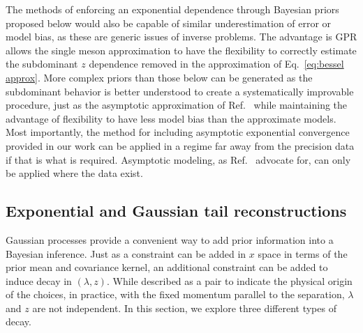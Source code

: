 \documentclass[aps,prl,groupedaddress,twocolumn,superscriptaddress,amsfonts,amssymb,amsmath,showpacs,floatfix,preprintnumbers]{revtex4-2}
\begin{document}
The methods of enforcing an exponential dependence through Bayesian priors proposed below would also be capable of similar underestimation of error or model bias, as these are generic issues of inverse problems. The advantage is GPR allows the single meson approximation to have the flexibility to correctly estimate the subdominant $z$ dependence removed in the approximation of Eq.~\ref{eq:bessel approx}. More complex priors than those below can be generated as the subdominant behavior is better understood to create a systematically improvable procedure, just as the asymptotic approximation of Ref.~\cite{Gao:2021dbh,Chen:2025cxr} while maintaining the advantage of flexibility to have less model bias than the approximate models. Most importantly, the method for including asymptotic exponential convergence provided in our work can be applied in a regime far away from the precision data if that is what is required. Asymptotic modeling, as Ref.~\cite{Gao:2021dbh,Chen:2025cxr} advocate for, can only be applied where the data exist.  



\subsection{Exponential and Gaussian tail reconstructions}

Gaussian processes provide a convenient way to add prior information into a Bayesian inference. 
Just as a constraint can be added in $x$ space in terms of the prior mean and covariance kernel, an additional constraint can be added to induce decay in $(\lambda,z)$. While described as a pair to indicate the physical origin of the choices, in practice, with the fixed momentum parallel to the separation, $\lambda$ and $z$ are not independent. In this section, we explore three different types of decay.
\end{document}
